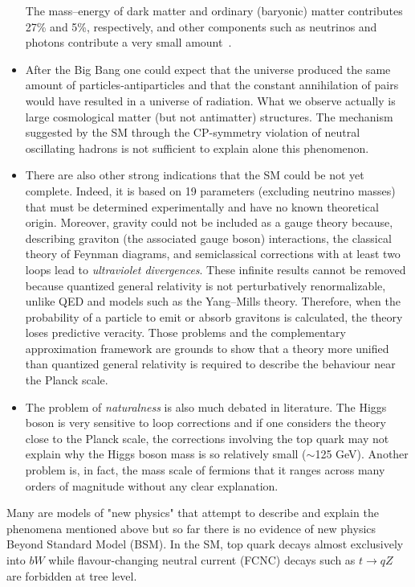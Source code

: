 \begin{itemize}
The mass–energy of dark matter and ordinary (baryonic) matter contributes 27\% and 5\%, respectively, and other components 
such as neutrinos and photons contribute a very small amount~\cite{plank}. 
\item After the Big Bang one could expect that the universe produced the same amount of particles-antiparticles and that the constant annihilation
of pairs would have resulted in a universe of radiation. What we observe actually is large cosmological matter (but not antimatter) structures.
The mechanism suggested by the SM through the CP-symmetry violation of neutral oscillating hadrons is not sufficient to explain alone this phenomenon.
\item There are also other strong indications that the SM could be not yet complete. Indeed, it is based on 19 parameters (excluding neutrino masses)
that must be determined experimentally and have no known theoretical origin.  Moreover, gravity could not be included as a gauge theory because, 
describing graviton (the associated gauge boson) interactions, the classical theory of  Feynman diagrams, and semiclassical corrections with 
at least two loops lead to \textit{ultraviolet divergences}. These infinite results cannot be removed 
because quantized general relativity is not perturbatively renormalizable, unlike QED and models such as the Yang–Mills theory. 
Therefore, when the probability of a particle to emit or absorb gravitons is calculated, the theory loses predictive veracity. 
Those problems and the complementary approximation framework are grounds to show that a theory more unified than quantized general relativity is 
required to describe the behaviour near the Planck scale. 
\item The problem of \textit{naturalness} is also much debated in literature. The Higgs boson is very sensitive to loop corrections and if one considers the theory close to the Planck scale, the corrections involving the top quark may not explain why the Higgs boson mass is so relatively small ($\sim$125 GeV). Another problem is, in fact, the mass scale of fermions that it ranges across many orders of magnitude without any clear explanation.
\end{itemize}
Many are models of "new physics" that attempt to describe and explain the phenomena mentioned above but so far there is no evidence of new physics Beyond Standard Model (BSM). 
In the SM, top quark decays almost exclusively into $bW$ while flavour-changing neutral current (FCNC) decays such as $t\rightarrow qZ$ are forbidden at tree level. 
